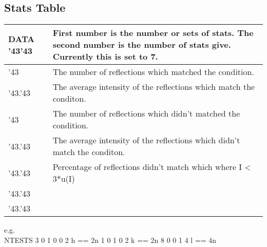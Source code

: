 \documentclass[11pt]{article}
\newcommand{\hash}{\char '43} %
\begin{document}
\subsection{Stats Table}
\begin{table}[h]
\begin{tabular}{|l|l|}\hline
DATA \hash  \hash & First number is the number or sets of stats. The second number is the number of stats give. Currently this is set to 7.\\
\hline
\hash & The number of reflections which matched the condition.\\\hline
\hash.\hash & The average intensity of the reflections which match the conditon.\\\hline
\hash & The number of reflections which didn't matched the condition.\\\hline
\hash.\hash & The average intensity of the reflections which didn't match the conditon.\\\hline
\hash.\hash & Percentage of reflections didn't match which where I < 3*u(I)\\\hline
\hash.\hash & \\\hline
\hash.\hash & \\\hline
\hline
\end{tabular}
\end{table}
e.g.\\
NTESTS 3
0 1 0 0 2 h == 2n
1 0 1 0 2 k == 2n
8 0 0 1 4 l == 4n
 
\end{document}
